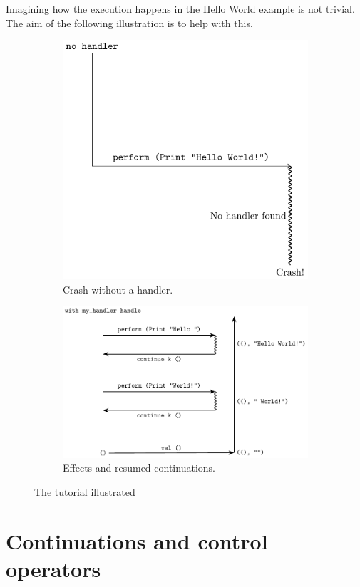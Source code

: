 \documentclass[class=article, crop=false]{standalone}
\begin{document}
Imagining how the execution happens in the Hello World example is not trivial.
The aim of the following illustration is to help with this.
\begin{figure}[ht]
\begin{subfigure}{.5\textwidth}
  \centering
  \includegraphics[width=.625\linewidth]{../figures/exception_control_flow.pdf}

  \caption{Crash without a handler.}
  \label{fig:exception}
\end{subfigure}
\begin{subfigure}{.5\textwidth}
  \centering
  \includegraphics[width=\linewidth]{../figures/handler_hello_world.pdf}

  \caption{Effects and resumed continuations.}
  \label{fig:exception}
\end{subfigure}
\caption{The tutorial illustrated}
\end{figure}

\section{Continuations and control operators}
\label{section-continuations}
\end{document}

